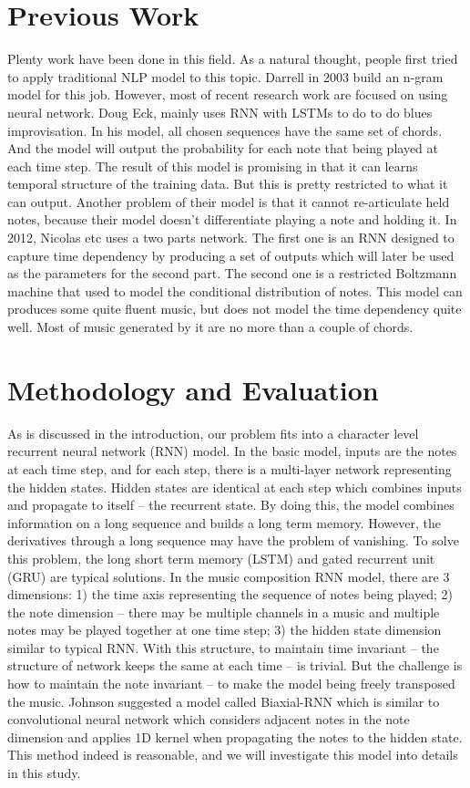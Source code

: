 \documentclass[10pt,journal]{IEEEtran}
\begin{document}
\section{Previous Work}
Plenty work have been done in this field.
As a natural thought, people first tried to apply traditional NLP model to this topic.
Darrell\cite{conklin2003music} in 2003 build an n-gram model for this job.
However, most of recent research work are focused on using neural network.
Doug Eck\cite{eck2002first}, mainly uses RNN with LSTMs to do to do blues improvisation. 
In his model, all chosen sequences have the same set of chords.
And the model will output the probability for each note that being played at each time step.
The result of this model is promising in that it can learns temporal structure of the training data.
But this is pretty restricted to what it can output.
Another problem of their model is that it cannot re-articulate held notes,
because their model doesn't differentiate playing a note and holding it.
In 2012, Nicolas etc\cite{boulanger2012modeling} uses a two parts network.
The first one is an RNN designed to capture time dependency by producing a set of outputs which will later be used as the
parameters for the second part.
The second one is a restricted Boltzmann machine that used to model the conditional distribution of notes.
This model can produces some quite fluent music,
but does not model the time dependency quite well. Most of music generated by it are no more than a couple of chords.


\section{Methodology and Evaluation}
As is discussed in the introduction, our problem fits into a character level recurrent neural network (RNN) model.
In the basic model, inputs are the notes at each time step, and for each step, there is a multi-layer network representing the hidden states.
Hidden states are identical at each step which combines inputs and propagate to itself – the recurrent state.
By doing this, the model combines information on a long sequence and builds a long term memory.
However, the derivatives through a long sequence may have the problem of vanishing.
To solve this problem, the long short term memory (LSTM) and gated recurrent unit (GRU) are typical solutions.
In the music composition RNN model, there are 3 dimensions:
1) the time axis representing the sequence of notes being played;
2) the note dimension – there may be multiple channels in a music and multiple notes may be played together at one time step;
3) the hidden state dimension similar to typical RNN.
With this structure, to maintain time invariant – the structure of network keeps the same at each time – is trivial.
But the challenge is how to maintain the note invariant – to make the model being freely transposed the music.
Johnson suggested a model called Biaxial-RNN which is similar to convolutional neural network which considers adjacent notes in the note dimension and applies 1D kernel when propagating the notes to the hidden state.
This method indeed is reasonable, and we will investigate this model into details in this study.
\end{document}
